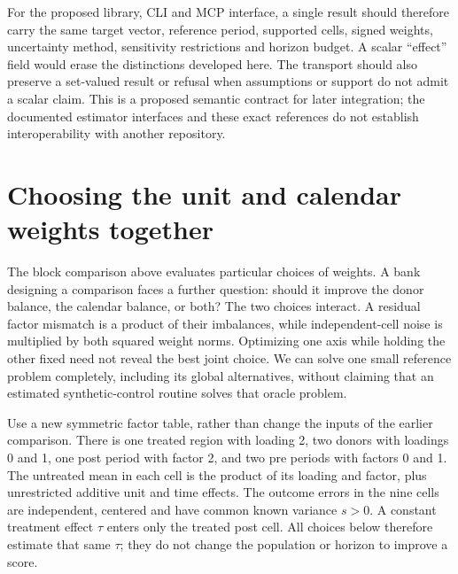 For the proposed library, CLI and MCP interface, a single result should
therefore carry the same target vector, reference period, supported
cells, signed weights, uncertainty method, sensitivity restrictions
and horizon budget. A scalar ``effect'' field would erase the
distinctions developed here. The transport should also preserve a
set-valued result or refusal when assumptions or support do not
admit a scalar claim. This is a proposed semantic contract for later
integration; the documented estimator interfaces and these exact
references do not establish interoperability with another repository.



\section{Choosing the unit and calendar weights together}
\label{exec17:s6-joint}

The block comparison above evaluates particular choices of weights. A bank
designing a comparison faces a further question: should it improve the donor
balance, the calendar balance, or both? The two choices interact. A residual
factor mismatch is a product of their imbalances, while independent-cell
noise is multiplied by both squared weight norms. Optimizing one axis while
holding the other fixed need not reveal the best joint choice. We can solve
one small reference problem completely, including its global alternatives,
without claiming that an estimated synthetic-control routine solves that
oracle problem.~\citep{exec17_s6_extension}

Use a new symmetric factor table, rather than change the inputs of the earlier
comparison. There is one treated region with loading 2, two donors with
loadings 0 and 1, one post period with factor 2, and two pre periods with
factors 0 and 1. The untreated mean in each cell is the product of its loading
and factor, plus unrestricted additive unit and time effects. The outcome
errors in the nine cells are independent, centered and have common known
variance $s>0$. A constant treatment effect $\tau$ enters only the treated
post cell. All choices below therefore estimate that same $\tau$; they do
not change the population or horizon to improve a score.

